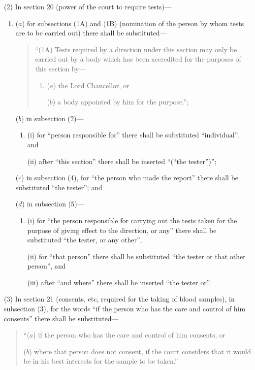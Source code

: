 \documentclass[12pt,a4paper]{article}
\begin{document}
(2) In section 20 (power of the court to require tests)—
\begin{enumerate}\item[]
($a$) for subsections (1A)  and (1B)  (nomination of the person by whom tests are to be carried out) there shall be substituted—
\begin{quotation}
“(1A) Tests required by a direction under this section may only be carried out by a body which has been accredited for the purposes of this section by—
\begin{enumerate}\item[]
($a$) the Lord Chancellor, or

($b$) a body appointed by him for the purpose.”;
\end{enumerate}
\end{quotation}

($b$) in subsection (2)—
\begin{enumerate}\item[]
(i) for “person responsible for” there shall be substituted “individual”, and

(ii) after “this section” there shall be inserted “(“the tester”)”;
\end{enumerate}

($c$) in subsection (4), for “the person who made the report” there shall be substituted “the tester”; and

($d$) in subsection (5)—
\begin{enumerate}\item[]
(i) for “the person responsible for carrying out the tests taken for the purpose of giving effect to the direction, or any” there shall be substituted “the tester, or any other”,

(ii) for “that person” there shall be substituted “the tester or that other person”, and

(iii) after “and where” there shall be inserted “the tester or”.
\end{enumerate}
\end{enumerate}

(3) In section 21 (consents, etc, required for the taking of blood samples), in subsection (3), for the words “if the person who has the care and control of him consents” there shall be substituted—
\begin{quotation}
“($a$) if the person who has the care and control of him consents; or

($b$) where that person does not consent, if the court considers that it would be in his best interests for the sample to be taken.”
\end{quotation}
\end{document}
